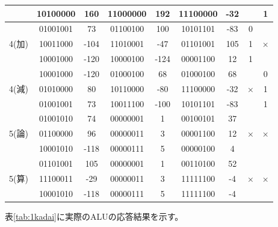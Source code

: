 \documentclass[11pt,a4j]{jsarticle}
\begin{document}
\begin{table}[htb]
\begin{center}
\begin{tabular}{|c|c|c|c|c|c|c|c|c|}
 & 10100000 & 160 & 11000000 & 192 &11100000  &-32  &  & 1 \\ \hline
 &01001001  & 73 &01100100  & 100 & 10101101 & -83 & 0 &  \\ \cline{2-8}
4(加) &  10011000& -104 & 11010001 & -47 & 01101001 &105  & 1 & × \\ \cline{2-8}
 &  10001000&-120  &  10000100& -124 &00001100  & 12 & 1 &  \\ \hline
 &10001000  & -120 & 01000100 & 68 &01000100  & 68 &  & 0 \\ \cline{2-7}\cline{9-9}
4(減) &01010000  & 80 & 10110000 & -80 & 11100000 & -32 & × & 1 \\ \cline{2-7}\cline{9-9}
 &01001001  &73  & 10011100 & -100 &10101101  &-83  &  & 1 \\ \hline
 & 01001010 &74  &00000001  &1  &00100101  & 37 &  &  \\ \cline{2-7}
5(論) &01100000  & 96 & 00000011 & 3 &00001100  &12  & × & × \\ \cline{2-7}
 & 10001010 &-118  & 00000111 &5  & 00000100 &4  &  &  \\ \hline
 &01101001  &105  &00000001  & 1 &00110100  &52  &  &  \\ \cline{2-7}
5(算) & 11100011 & -29 & 00000011 &3  &11111100  &-4  & × & × \\ \cline{2-7}
 & 10001010 & -118 &00000111  & 5 & 11111100 &-4  &  &  \\ \hline
    \end{tabular}
    \label{tab:1junbi}
  \end{center}
 \end{table}
  
  
  表\ref{tab:1kadai}に実際のALUの応答結果を示す。
  
\end{document}
